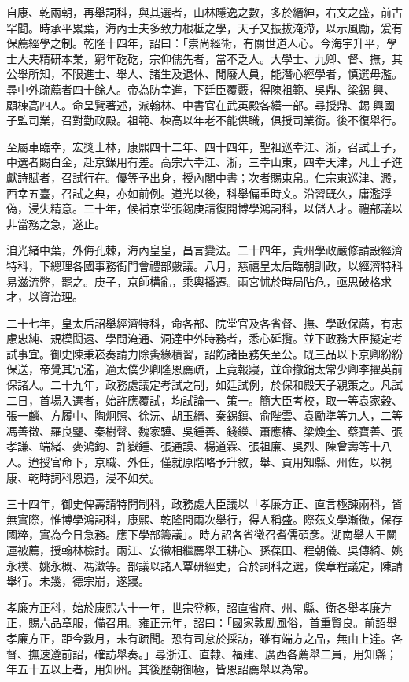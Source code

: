 \begin{pinyinscope}
自康、乾兩朝，再舉詞科，與其選者，山林隱逸之數，多於縉紳，右文之盛，前古罕聞。時承平累葉，海內士夫多致力根柢之學，天子又振拔淹滯，以示風勵，爰有保薦經學之制。乾隆十四年，詔曰：「崇尚經術，有關世道人心。今海宇升平，學士大夫精研本業，窮年矻矻，宗仰儒先者，當不乏人。大學士、九卿、督、撫，其公舉所知，不限進士、舉人、諸生及退休、閒廢人員，能潛心經學者，慎選毋濫。尋中外疏薦者四十餘人。帝為防幸進，下廷臣覆覈，得陳祖範、吳鼎、梁錫興、顧棟高四人。命呈覽著述，派翰林、中書官在武英殿各繕一部。尋授鼎、錫興國子監司業，召對勤政殿。祖範、棟高以年老不能供職，俱授司業銜。後不復舉行。

至屬車臨幸，宏獎士林，康熙四十二年、四十四年，聖祖巡幸江、浙，召試士子，中選者賜白金，赴京錄用有差。高宗六幸江、浙，三幸山東，四幸天津，凡士子進獻詩賦者，召試行在。優等予出身，授內閣中書；次者賜束帛。仁宗東巡津、澱，西幸五臺，召試之典，亦如前例。道光以後，科舉偏重時文。沿習既久，庸濫浮偽，浸失精意。三十年，候補京堂張錫庚請復開博學鴻詞科，以儲人才。禮部議以非當務之急，遂止。

洎光緒中葉，外侮孔棘，海內皇皇，昌言變法。二十四年，貴州學政嚴修請設經濟特科，下總理各國事務衙門會禮部覈議。八月，慈禧皇太后臨朝訓政，以經濟特科易滋流弊，罷之。庚子，京師構亂，乘輿播遷。兩宮怵於時局阽危，亟思破格求才，以資治理。

二十七年，皇太后詔舉經濟特科，命各部、院堂官及各省督、撫、學政保薦，有志慮忠純、規模閎遠、學問淹通、洞達中外時務者，悉心延攬。並下政務大臣擬定考試事宜。御史陳秉崧奏請力除夤緣積習，詔飭諸臣務矢至公。既三品以下京卿紛紛保送，帝覺其冗濫，適太僕少卿隆恩薦疏，上竟報寢，並命撤銷太常少卿李擢英前保諸人。二十九年，政務處議定考試之制，如廷試例，於保和殿天子親策之。凡試二日，首場入選者，始許應覆試，均試論一、策一。簡大臣考校，取一等袁家穀、張一麟、方履中、陶炯照、徐沅、胡玉縉、秦錫鎮、俞陛雲、袁勵準等九人，二等馮善徵、羅良鑒、秦樹聲、魏家驊、吳鍾善、錢鑅、蕭應椿、梁煥奎、蔡寶善、張孝謙、端緒、麥鴻鈞、許嶽鍾、張通謨、楊道霖、張祖廉、吳烈、陳曾壽等十八人。迨授官命下，京職、外任，僅就原階略予升敘，舉、貢用知縣、州佐，以視康、乾時詞科恩遇，浸不如矣。

三十四年，御史俾壽請特開制科，政務處大臣議以「孝廉方正、直言極諫兩科，皆無實際，惟博學鴻詞科，康熙、乾隆間兩次舉行，得人稱盛。際茲文學漸微，保存國粹，實為今日急務。應下學部籌議」。時方詔各省徵召耆儒碩彥。湖南舉人王闓運被薦，授翰林檢討。兩江、安徽相繼薦舉王耕心、孫葆田、程朝儀、吳傳綺、姚永樸、姚永概、馮澂等。部議以諸人覃研經史，合於詞科之選，俟章程議定，陳請舉行。未幾，德宗崩，遂寢。

孝廉方正科，始於康熙六十一年，世宗登極，詔直省府、州、縣、衛各舉孝廉方正，賜六品章服，備召用。雍正元年，詔曰：「國家敦勵風俗，首重賢良。前詔舉孝廉方正，距今數月，未有疏聞。恐有司怠於採訪，雖有端方之品，無由上達。各督、撫速遵前詔，確訪舉奏。」尋浙江、直隸、福建、廣西各薦舉二員，用知縣；年五十五以上者，用知州。其後歷朝御極，皆恩詔薦舉以為常。


\end{pinyinscope}
